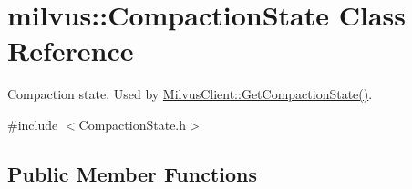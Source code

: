 \hypertarget{classmilvus_1_1_compaction_state}{}\section{milvus\+:\+:Compaction\+State Class Reference}
\label{classmilvus_1_1_compaction_state}


Compaction state. Used by \hyperlink{classmilvus_1_1_milvus_client_a8041cd363470774d2cdb3c295307e1d9}{Milvus\+Client\+::\+Get\+Compaction\+State()}.  




{\ttfamily \#include $<$Compaction\+State.\+h$>$}

\subsection*{Public Member Functions}
